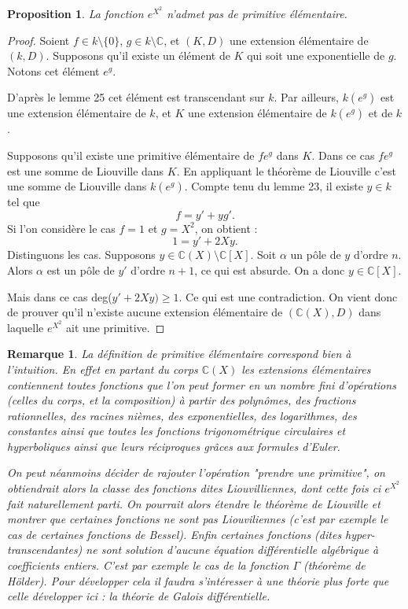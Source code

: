 \documentclass[12pt,a4paper]{report}
\newtheorem{prop}[thm]{\bf Proposition}
\newtheorem{rem}[thm]{Remarque}
\begin{document}
\begin{prop}\rm
La fonction $e^{X^{2}}$ n'admet pas de primitive élémentaire. 
\end{prop}

\begin{proof}
Soient $f \in k \setminus \{0\}$, $g \in k \setminus \mathbb{C}$, et $(K,D)$ une extension élémentaire de $(k,D)$. Supposons qu'il existe un élément de $K$ qui soit une exponentielle de $g$. Notons cet élément $e^{g}$. 

D'après le lemme 25 cet élément est transcendant sur $k$. Par ailleurs, $k(e^{g})$ est une extension élémentaire de $k$, et $K$ une extension élémentaire de $k(e^{g})$ et de $k$. 

Supposons qu'il existe une primitive élémentaire de $fe^{g}$ dans $K$. Dans ce cas $fe^{g}$ est une somme de Liouville dans $K$. En appliquant le théorème de Liouville c'est une somme de Liouville dans $k(e^{g})$. Compte tenu du lemme 23, il existe $y \in k$ tel que 
$$f=y'+yg'.$$
Si l'on considère le cas $f=1$ et $g=X^{2}$, on obtient : 
$$1=y'+2Xy.$$
Distinguons les cas. Supposons $y\in \mathbb{C}(X)\setminus \mathbb{C}[X]$. Soit $\alpha$ un pôle de $y$ d'ordre $n$. Alors $\alpha$ est un pôle de $y'$ d'ordre $n+1$, ce qui est absurde. On a donc $y \in \mathbb{C}[X]$. 

Mais dans ce cas deg($y'+2Xy)\geq 1$. Ce qui est une contradiction. On vient donc de prouver qu'il n'existe aucune extension élémentaire de $(\mathbb{C}(X),D)$ dans laquelle $e^{X^{2}}$ ait une primitive. 

\end{proof}

\begin{rem}\rm
La définition de primitive élémentaire correspond bien à l'intuition. En effet en partant du corps $\mathbb{C}(X)$ les extensions élémentaires contiennent toutes fonctions que l'on peut former en un nombre fini d'opérations (celles du corps, et la composition) à partir des polynômes, des fractions rationnelles, des racines nièmes, des exponentielles, des logarithmes, des constantes ainsi que toutes les fonctions trigonométrique circulaires et hyperboliques ainsi que leurs réciproques grâces aux formules d'Euler. 

On peut néanmoins décider de rajouter l'opération "prendre une primitive", on obtiendrait alors la classe des fonctions dites Liouvilliennes, dont cette fois ci $e^{X^{2}}$ fait naturellement parti. On pourrait alors étendre le théorème de Liouville et montrer que certaines fonctions ne sont pas Liouviliennes (c'est par exemple le cas de certaines fonctions de Bessel). Enfin certaines fonctions (dites hyper-transcendantes) ne sont solution d'aucune équation différentielle algébrique à coefficients entiers. C'est par exemple le cas de la fonction $\Gamma$ (théorème de Hölder). Pour développer cela il faudra s'intéresser à une théorie plus forte que celle développer ici : la théorie de Galois différentielle. 
\end{rem}
\end{document}
